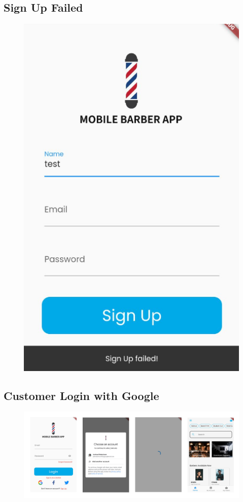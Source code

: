 \documentclass[12pt]{article}
\begin{document}
	\subsection{Sign Up Failed}
	\label{app-image: sign-up-failed}
	\begin{figure}[H]
		\centering
		\includegraphics[scale=0.4]{images/sign-up-failed.png}
	\end{figure}

	\subsection{Customer Login with Google}
	\label{app-image: login-google}
	\begin{figure}[H]
		\centering
		\includegraphics[scale=0.22]{images/google-login.png}
	\end{figure}
\end{document}
